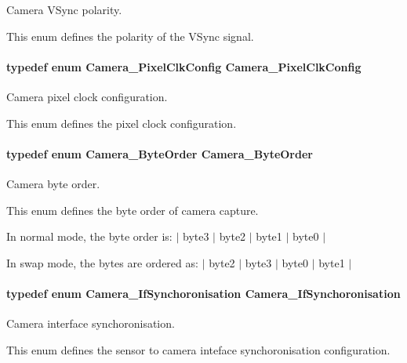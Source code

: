 Camera V\+Sync polarity. 

This enum defines the polarity of the V\+Sync signal. 
\paragraph[{Camera\+\_\+\+Pixel\+Clk\+Config}]{\setlength{\rightskip}{0pt plus 5cm}typedef enum {\bf Camera\+\_\+\+Pixel\+Clk\+Config}  {\bf Camera\+\_\+\+Pixel\+Clk\+Config}}\label{_camera_8h_a844022cef41a1a6df47b87ec46f8d658}


Camera pixel clock configuration. 

This enum defines the pixel clock configuration. 
\paragraph[{Camera\+\_\+\+Byte\+Order}]{\setlength{\rightskip}{0pt plus 5cm}typedef enum {\bf Camera\+\_\+\+Byte\+Order}  {\bf Camera\+\_\+\+Byte\+Order}}\label{_camera_8h_ae04f64f1517285b35f56ac4f3ae6008f}


Camera byte order. 

This enum defines the byte order of camera capture.

In normal mode, the byte order is\+: $\vert$ byte3 $\vert$ byte2 $\vert$ byte1 $\vert$ byte0 $\vert$

In swap mode, the bytes are ordered as\+: $\vert$ byte2 $\vert$ byte3 $\vert$ byte0 $\vert$ byte1 $\vert$ 
\paragraph[{Camera\+\_\+\+If\+Synchoronisation}]{\setlength{\rightskip}{0pt plus 5cm}typedef enum {\bf Camera\+\_\+\+If\+Synchoronisation}  {\bf Camera\+\_\+\+If\+Synchoronisation}}\label{_camera_8h_af205d344ecb59e656c640241783ddf6c}


Camera interface synchoronisation. 

This enum defines the sensor to camera inteface synchoronisation configuration. 
